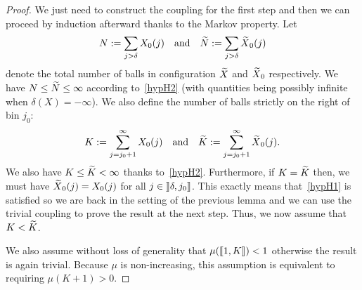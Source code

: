 \documentclass[10pt]{amsart}
\theoremstyle{definition}\newtheorem{defi}[theo]{Definition}\newtheorem{rema}[theo]{Remark}\newtheorem{exam}[theo]{Example}\newtheorem{exem}[theo]{Example}\newtheorem{nota}[theo]{Notation}
\let\oldin\in
\renewcommand{\in}{\mathchoice{\oldin}{\oldin}{\,\oldin\,}{\,\oldin\,}}
\let\oldtilde\tilde
\renewcommand*{\tilde}[1]{\mathchoice{\widetilde{#1}}{\widetilde{#1}}{\oldtilde{#1}}{\oldtilde{#1}}}
\newcommand{\llbracket}{\mathopen{[\mkern -2.7mu[}}
\newcommand{\rrbracket}{\mathclose{]\mkern -2.7mu]}}
\newcommand{\rrbracketopen}{\mathopen{]\mkern -2.7mu]}}
\newcommand{\llb}{\llbracket}
\newcommand{\rrb}{\rrbracket}
\begin{document}
\begin{proof}
We just need to construct the coupling for the first step and then we can proceed by induction afterward thanks to the Markov property. Let
\[
N
:= \sum_{j > \delta} X_0(j) \quad\text{and} \quad \tilde{N}
:= \sum_{j > \delta} \tilde{X}_0(j)
\]
denote the total number of balls in configuration $\tilde{X}$ and $\tilde{X}_0$ respectively. We have $N\leq \tilde{N}\leq\infty$ according to~\eqref{hypH2} (with quantities being possibly infinite when $\delta(X) =-\infty$). We also define the number of balls strictly on the right of bin $j_0$:
\[
K
:= \sum_{j = j_0 + 1}^\infty X_0(j) \quad \text{and} \quad \tilde{K}
:= \sum_{j = j_0 + 1}^\infty \tilde{X}_0(j).
\]
We also have $K \leq \tilde{K} < \infty$ thanks to~\eqref{hypH2}. Furthermore, if $K = \tilde{K}$ then, we must have $\tilde{X}_0(j) = X_0(j)$ for all $j\in \rrbracketopen \delta, j_0\rrb$. This exactly means that~\eqref{hypH1} is satisfied so we are back in the setting of the previous lemma and we can use the trivial coupling to prove the result at the next step. Thus, we now assume that $K < \tilde{K}$.

We also assume without loss of generality that $\mu(\llb 1, K\rrb) < 1$ otherwise the result is again trivial. Because $\mu$ is non-increasing, this assumption is equivalent to requiring $\mu(K+1) > 0$.


\end{proof}
\end{document}
